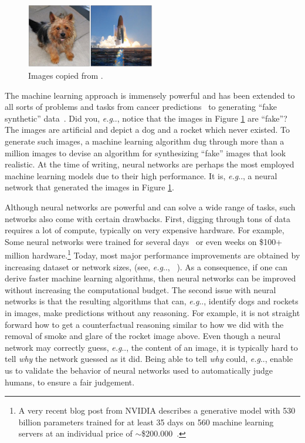 \documentclass[11pt,a4paper,twoside,openright,final]{memoir}
\makeatletter
\DeclareRobustCommand\onedot{\futurelet\@let@token\@onedot}
\def\@onedot{\ifx\@let@token.\else.\null\fi\xspace}
\def\eg{\emph{e.g}\onedot} \def\Eg{\emph{E.g}\onedot}
\makeatother
\begin{document}
\begin{figure}
    \centering
    \includegraphics[width=0.5\textwidth]{graphics/biggan.png}
    \caption{Images copied from \cite{biggan}.}
    \label{fig:biggan-samples}
\end{figure}

The machine learning approach is immensely powerful and has been extended to all sorts of problems and tasks from cancer predictions~\cite{cancer} to generating ``fake synthetic'' data~\cite{biggan}. 
Did you, \eg, notice that the images in Figure \ref{fig:biggan-samples} are ``fake''? 
The images are artificial and depict a dog and a rocket which never existed.
To generate such images, a machine learning algorithm dug through more than a million images to devise an algorithm for synthesizing ``fake'' images that look realistic. 
At the time of writing, neural networks are perhaps the most employed machine learning models due to their high performance. 
It is, \eg, a neural network that generated the images in Figure \ref{fig:biggan-samples}. 

Although neural networks are powerful and can solve a wide range of tasks, such networks also come with certain drawbacks.
First, digging through tons of data requires a lot of compute, typically on very expensive hardware.
For example, Some neural networks were trained for several days~\cite{alexnet, alphafold} or even weeks on \$100+ million hardware.\footnote{A very recent blog post from NVIDIA describes a generative model with 530 billion parameters trained for at least 35 days on 560 machine learning servers at an individual price of $\sim$\$200.000~\cite{nvidia-bigass-mofo}.}
Today, most major performance improvements are obtained by increasing dataset or network sizes, (see, \eg, ~\cite{gpt-3}).
As a consequence, if one can derive faster machine learning algorithms, then neural networks can be improved without increasing the computational budget.
The second issue with neural networks is that the resulting algorithms that can, \eg, identify dogs and rockets in images, make predictions without any reasoning.
For example, it is not straight forward how to get a counterfactual reasoning similar to how we did with the removal of smoke and glare of the rocket image above.
Even though a neural network may correctly guess, \eg, the content of an image, it is typically hard to tell \emph{why} the network guessed as it did.
Being able to tell \emph{why} could, \eg, enable us to validate the behavior of neural networks used to automatically judge humans, to ensure a fair judgement.
\end{document}
